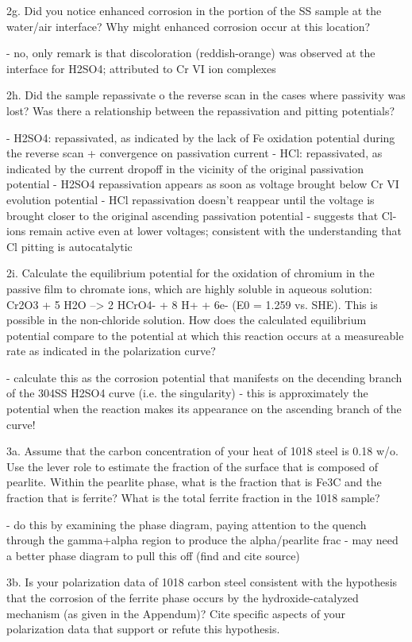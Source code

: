 2g. Did you notice enhanced corrosion in the portion of the SS sample at the water/air interface?  Why might enhanced corrosion occur at this location?

	- no, only remark is that discoloration (reddish-orange) was observed at the interface for H2SO4; attributed to Cr VI ion complexes

2h. Did the sample repassivate o the reverse scan in the cases where passivity was lost?  Was there a relationship between the repassivation and pitting potentials?

	- H2SO4: repassivated, as indicated by the lack of Fe oxidation potential during the reverse scan + convergence on passivation current
	- HCl: repassivated, as indicated by the current dropoff in the vicinity of the original passivation potential
	- H2SO4 repassivation appears as soon as voltage brought below Cr VI evolution potential
	- HCl repassivation doesn't reappear until the voltage is brought closer to the original ascending passivation potential
	- suggests that Cl- ions remain active even at lower voltages; consistent with the understanding that Cl pitting is autocatalytic

2i. Calculate the equilibrium potential for the oxidation of chromium in the passive film to chromate ions, which are highly soluble in aqueous solution: Cr2O3 + 5 H2O --> 2 HCrO4- + 8 H+ + 6e- (E0 = 1.259 vs. SHE).  This is possible in the non-chloride solution.  How does the calculated equilibrium potential compare to the potential at which this reaction occurs at a measureable rate as indicated in the polarization curve?

	- calculate this as the corrosion potential that manifests on the decending branch of the 304SS H2SO4 curve (i.e. the singularity)
	- this is approximately the potential when the reaction makes its appearance on the ascending branch of the curve!

3a. Assume that the carbon concentration of your heat of 1018 steel is 0.18 w/o.  Use the lever role to estimate the fraction of the surface that is composed of pearlite.  Within the pearlite phase, what is the fraction that is Fe3C and the fraction that is ferrite?  What is the total ferrite fraction in the 1018 sample?

	- do this by examining the phase diagram, paying attention to the quench through the gamma+alpha region to produce the alpha/pearlite frac
	- may need a better phase diagram to pull this off (find and cite source)

3b. Is your polarization data of 1018 carbon steel consistent with the hypothesis that the corrosion of the ferrite phase occurs by the hydroxide-catalyzed mechanism (as given in the Appendum)?  Cite specific aspects of your polarization data that support or refute this hypothesis.

